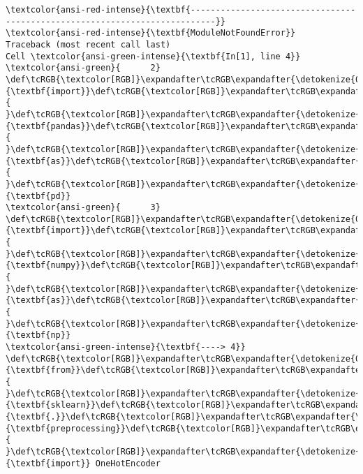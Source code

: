 \documentclass[11pt]{article}
\begin{document}
    \begin{Verbatim}[commandchars=\\\{\}, frame=single, framerule=2mm, rulecolor=\color{outerrorbackground}]
\textcolor{ansi-red-intense}{\textbf{---------------------------------------------------------------------------}}
\textcolor{ansi-red-intense}{\textbf{ModuleNotFoundError}}                       Traceback (most recent call last)
Cell \textcolor{ansi-green-intense}{\textbf{In[1], line 4}}
\textcolor{ansi-green}{      2} \def\tcRGB{\textcolor[RGB]}\expandafter\tcRGB\expandafter{\detokenize{0,135,0}}{\textbf{import}}\def\tcRGB{\textcolor[RGB]}\expandafter\tcRGB\expandafter{\detokenize{188,188,188}}{ }\def\tcRGB{\textcolor[RGB]}\expandafter\tcRGB\expandafter{\detokenize{0,0,255}}{\textbf{pandas}}\def\tcRGB{\textcolor[RGB]}\expandafter\tcRGB\expandafter{\detokenize{188,188,188}}{ }\def\tcRGB{\textcolor[RGB]}\expandafter\tcRGB\expandafter{\detokenize{0,135,0}}{\textbf{as}}\def\tcRGB{\textcolor[RGB]}\expandafter\tcRGB\expandafter{\detokenize{188,188,188}}{ }\def\tcRGB{\textcolor[RGB]}\expandafter\tcRGB\expandafter{\detokenize{0,0,255}}{\textbf{pd}}
\textcolor{ansi-green}{      3} \def\tcRGB{\textcolor[RGB]}\expandafter\tcRGB\expandafter{\detokenize{0,135,0}}{\textbf{import}}\def\tcRGB{\textcolor[RGB]}\expandafter\tcRGB\expandafter{\detokenize{188,188,188}}{ }\def\tcRGB{\textcolor[RGB]}\expandafter\tcRGB\expandafter{\detokenize{0,0,255}}{\textbf{numpy}}\def\tcRGB{\textcolor[RGB]}\expandafter\tcRGB\expandafter{\detokenize{188,188,188}}{ }\def\tcRGB{\textcolor[RGB]}\expandafter\tcRGB\expandafter{\detokenize{0,135,0}}{\textbf{as}}\def\tcRGB{\textcolor[RGB]}\expandafter\tcRGB\expandafter{\detokenize{188,188,188}}{ }\def\tcRGB{\textcolor[RGB]}\expandafter\tcRGB\expandafter{\detokenize{0,0,255}}{\textbf{np}}
\textcolor{ansi-green-intense}{\textbf{----> 4}} \def\tcRGB{\textcolor[RGB]}\expandafter\tcRGB\expandafter{\detokenize{0,135,0}}{\textbf{from}}\def\tcRGB{\textcolor[RGB]}\expandafter\tcRGB\expandafter{\detokenize{188,188,188}}{ }\def\tcRGB{\textcolor[RGB]}\expandafter\tcRGB\expandafter{\detokenize{0,0,255}}{\textbf{sklearn}}\def\tcRGB{\textcolor[RGB]}\expandafter\tcRGB\expandafter{\detokenize{0,0,255}}{\textbf{.}}\def\tcRGB{\textcolor[RGB]}\expandafter\tcRGB\expandafter{\detokenize{0,0,255}}{\textbf{preprocessing}}\def\tcRGB{\textcolor[RGB]}\expandafter\tcRGB\expandafter{\detokenize{188,188,188}}{ }\def\tcRGB{\textcolor[RGB]}\expandafter\tcRGB\expandafter{\detokenize{0,135,0}}{\textbf{import}} OneHotEncoder

\end{Verbatim}
\end{document}
